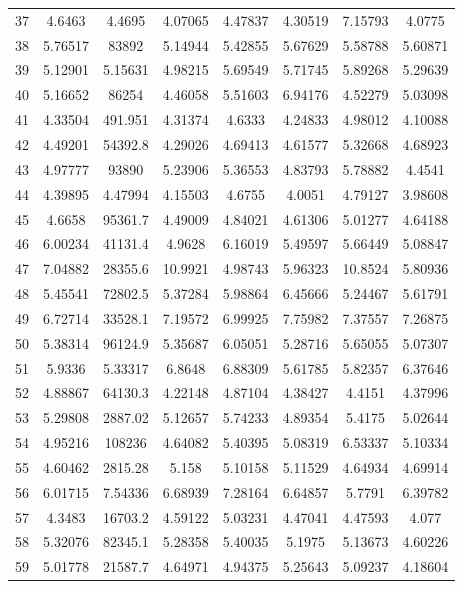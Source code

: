 \begin{center}
\begin{longtable}{cccccccc}
37 & 4.6463 & 4.4695 & 4.07065 & 4.47837 & 4.30519 & 7.15793 & 4.0775\\
38 & 5.76517 & 83892 & 5.14944 & 5.42855 & 5.67629 & 5.58788 & 5.60871\\
39 & 5.12901 & 5.15631 & 4.98215 & 5.69549 & 5.71745 & 5.89268 & 5.29639\\
40 & 5.16652 & 86254 & 4.46058 & 5.51603 & 6.94176 & 4.52279 & 5.03098\\
41 & 4.33504 & 491.951 & 4.31374 & 4.6333 & 4.24833 & 4.98012 & 4.10088\\
42 & 4.49201 & 54392.8 & 4.29026 & 4.69413 & 4.61577 & 5.32668 & 4.68923\\
43 & 4.97777 & 93890 & 5.23906 & 5.36553 & 4.83793 & 5.78882 & 4.4541\\
44 & 4.39895 & 4.47994 & 4.15503 & 4.6755 & 4.0051 & 4.79127 & 3.98608\\
45 & 4.6658 & 95361.7 & 4.49009 & 4.84021 & 4.61306 & 5.01277 & 4.64188\\
46 & 6.00234 & 41131.4 & 4.9628 & 6.16019 & 5.49597 & 5.66449 & 5.08847\\
47 & 7.04882 & 28355.6 & 10.9921 & 4.98743 & 5.96323 & 10.8524 & 5.80936\\
48 & 5.45541 & 72802.5 & 5.37284 & 5.98864 & 6.45666 & 5.24467 & 5.61791\\
49 & 6.72714 & 33528.1 & 7.19572 & 6.99925 & 7.75982 & 7.37557 & 7.26875\\
50 & 5.38314 & 96124.9 & 5.35687 & 6.05051 & 5.28716 & 5.65055 & 5.07307\\
51 & 5.9336 & 5.33317 & 6.8648 & 6.88309 & 5.61785 & 5.82357 & 6.37646\\
52 & 4.88867 & 64130.3 & 4.22148 & 4.87104 & 4.38427 & 4.4151 & 4.37996\\
53 & 5.29808 & 2887.02 & 5.12657 & 5.74233 & 4.89354 & 5.4175 & 5.02644\\
54 & 4.95216 & 108236 & 4.64082 & 5.40395 & 5.08319 & 6.53337 & 5.10334\\
55 & 4.60462 & 2815.28 & 5.158 & 5.10158 & 5.11529 & 4.64934 & 4.69914\\
56 & 6.01715 & 7.54336 & 6.68939 & 7.28164 & 6.64857 & 5.7791 & 6.39782\\
57 & 4.3483 & 16703.2 & 4.59122 & 5.03231 & 4.47041 & 4.47593 & 4.077\\
58 & 5.32076 & 82345.1 & 5.28358 & 5.40035 & 5.1975 & 5.13673 & 4.60226\\
59 & 5.01778 & 21587.7 & 4.64971 & 4.94375 & 5.25643 & 5.09237 & 4.18604\\

\end{longtable}
\end{center}

